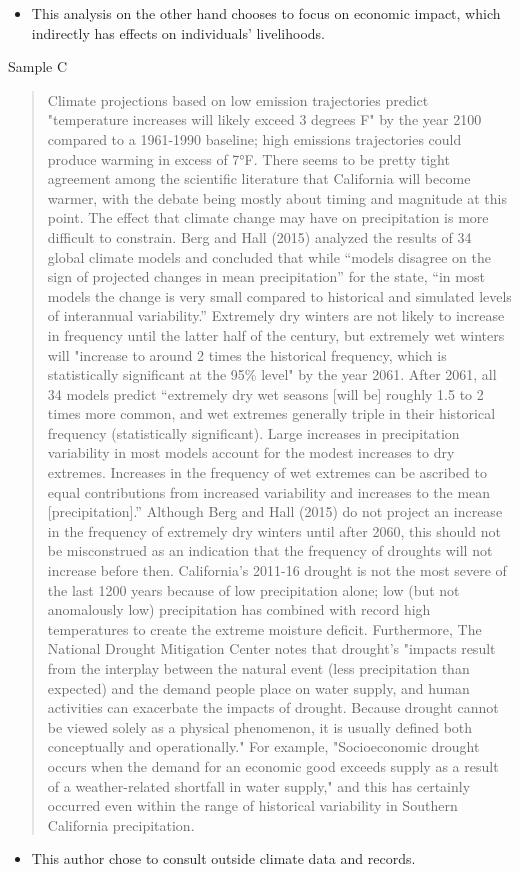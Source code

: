\documentclass{article}\usepackage[]{graphicx}\usepackage[]{color}
\begin{document}
\begin{itemize}
  \item This analysis on the other hand chooses to focus on economic impact, which indirectly has effects on individuals' livelihoods. 
\end{itemize}

Sample C
\begin{quote}
Climate projections based on low emission trajectories predict "temperature increases will likely exceed 3 degrees F" by the year 2100 compared to a 1961-1990 baseline; high emissions trajectories could produce warming in excess of 7°F. There seems to be pretty tight agreement among the scientific literature that California will become warmer, with the debate being mostly about timing and magnitude at this point. The effect that climate change may have on precipitation is more difficult to constrain. Berg and Hall (2015) analyzed the results of 34 global climate models and concluded that while “models disagree on the sign of projected changes in mean precipitation” for the state, “in most models the change is very small compared to historical and simulated levels of interannual variability.” Extremely dry winters are not likely to increase in frequency until the latter half of the century, but extremely wet winters will "increase to around 2 times the historical frequency, which is statistically significant at the 95\% level" by the year 2061. After 2061, all 34 models predict “extremely dry wet seasons [will be] roughly 1.5 to 2 times more common, and wet extremes generally triple in their historical frequency (statistically significant). Large increases in precipitation variability in most models account for the modest increases to dry extremes. Increases in the frequency of wet extremes can be ascribed to equal contributions from increased variability and increases to the mean [precipitation].” Although Berg and Hall (2015) do not project an increase in the frequency of extremely dry winters until after 2060, this should not be misconstrued as an indication that the frequency of droughts will not increase before then. California's 2011-16 drought is not the most severe of the last 1200 years because of low precipitation alone; low (but not anomalously low) precipitation has combined with record high temperatures to create the extreme moisture deficit. Furthermore, The National Drought Mitigation Center notes that drought’s "impacts result from the interplay between the natural event (less precipitation than expected) and the demand people place on water supply, and human activities can exacerbate the impacts of drought. Because drought cannot be viewed solely as a physical phenomenon, it is usually defined both conceptually and operationally." For example, "Socioeconomic drought occurs when the demand for an economic good exceeds supply as a result of a weather-related shortfall in water supply," and this has certainly occurred even within the range of historical variability in Southern California precipitation.
\end{quote}
\begin{itemize}
  \item This author chose to consult outside climate data and records. 
\end{itemize}
\end{document}
